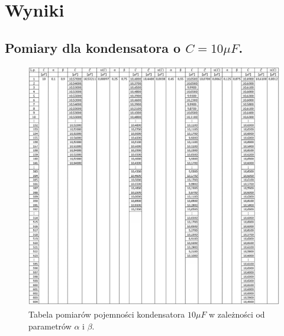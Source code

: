 \documentclass[12pt]{mwart}
\begin{document}
	\section{Wyniki}
	\subsection{Pomiary dla kondensatora o $C=10\mu F$.}
	\begin{figure}[H]
		\centering
		\includegraphics[width=1\linewidth, height=.9\textheight]{data/10_tab.jpg}
		\caption{Tabela pomiarów pojemności kondensatora $10\mu F$ w zależności od parametrów $\alpha$ i $\beta$.}
	\end{figure}
\end{document}
